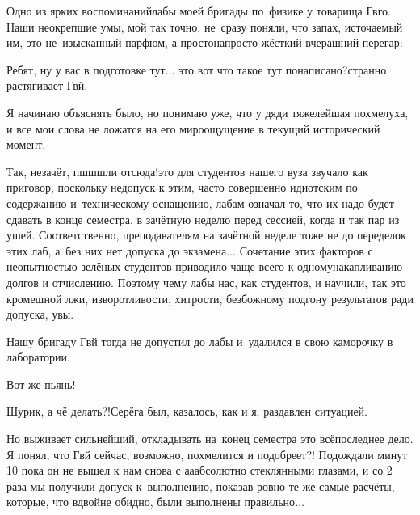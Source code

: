 \vspace{1.0cm}

Одно из ярких воспоминаний\mdash лабы моей бригады по~физике у товарища Гв\sdash го. Наши неокрепшие умы, мой так точно, не~сразу поняли, что запах, источаемый им, это не~изысканный парфюм, а просто\sdash напросто жёсткий вчерашний перегар:

\diagdash Ребят, ну у вас в подготовке тут$\ldots$ это вот что такое тут понаписано?\mdash странно растягивает Гв\sdash й.

Я начинаю объяснять было, но понимаю уже, что у дяди тяжелейшая похмелуха, и все мои слова не ложатся на его мироощущение в текущий исторический момент.

\diagdash Так, незачёт, пш\sdash ш\sdash шли отсюда!\mdash это для студентов нашего вуза звучало как приговор, поскольку недопуск к этим, часто совершенно идиотским по содержанию и~техническому оснащению, лабам означал то, что их надо будет сдавать в конце семестра, в зачётную неделю перед сессией, когда и так пар из ушей. Соответственно, преподавателям на зачётной неделе тоже не до переделок этих лаб, а~без них нет допуска до экзамена$\ldots$ Сочетание этих факторов с неопытностью зелёных студентов приводило чаще всего к одному\mdash накапливанию долгов и отчислению. Поэтому чему лабы нас, как студентов, и научили, так это кромешной лжи, изворотливости, хитрости, безбожному подгону результатов ради допуска, увы.

Нашу бригаду Гв\sdash й тогда не допустил до лабы и~удалился в свою каморочку в лаборатории. 

\diagdash Вот же пьянь!

\diagdash Шурик, а чё делать?!\mdash Серёга был, казалось, как и я, раздавлен ситуацией.

Но выживает сильнейший, откладывать на~конец семестра это всё\mdash последнее дело. Я понял, что Гв\sdash й сейчас, возможно, похмелится и подобреет?! Подождали минут 10 пока он не вышел к нам снова с а\sdash а\sdash абсолютно стеклянными глазами, и со 2 раза мы получили допуск к~выполнению, показав ровно те же самые расчёты, которые, что вдвойне обидно, были выполнены правильно$\ldots$

\vspace{1.0cm}

